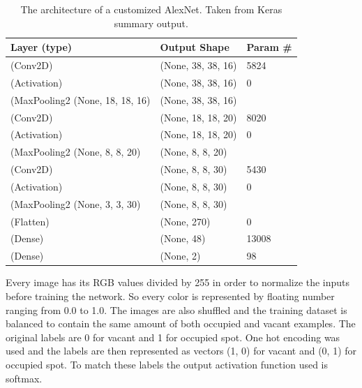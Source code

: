 \documentclass[thesis=M,english]{FITthesis}[2019/03/06]
\begin{document}
\begin{table}[ht!]
\centering
\caption{The architecture of a customized AlexNet. Taken from Keras summary output.}
\begin{tabular}{|l|l|l|}
\hline
\textbf{Layer (type)}                             & \textbf{Output Shape} & \textbf{Param \#} \\ \hline
(Conv2D)                                & (None, 38, 38, 16)    & 5824              \\ \hline
(Activation)                        & (None, 38, 38, 16)    & 0                 \\ \hline
(MaxPooling2 (None, 18, 18, 16) & (None, 38, 38, 16)    &                   \\ \hline
(Conv2D)                                & (None, 18, 18, 20)    & 8020              \\ \hline
(Activation)                        & (None, 18, 18, 20)    & 0                 \\ \hline
(MaxPooling2 (None, 8, 8, 20)   & (None, 8, 8, 20)      &                   \\ \hline
(Conv2D)                                & (None, 8, 8, 30)      & 5430              \\ \hline
(Activation)                        & (None, 8, 8, 30)      & 0                 \\ \hline
(MaxPooling2 (None, 3, 3, 30)   & (None, 8, 8, 30)      &                   \\ \hline
(Flatten)                              & (None, 270)           & 0                 \\ \hline
(Dense)                                  & (None, 48)            & 13008             \\ \hline
(Dense)                                  & (None, 2)             & 98                \\ \hline
\end{tabular}
\label{table:custom_alex}
\end{table}

Every image has its RGB values divided by 255 in order to normalize the inputs before training the network. So every color is represented by floating number ranging from 0.0 to 1.0. The images are also shuffled and the training dataset is balanced to contain the same amount of both occupied and vacant examples. The original labels are 0 for vacant and 1 for occupied spot. One hot encoding was used and the labels are then represented as vectors (1, 0) for vacant and (0, 1) for occupied spot. To match these labels the output activation function used is softmax.\\
\end{document}
